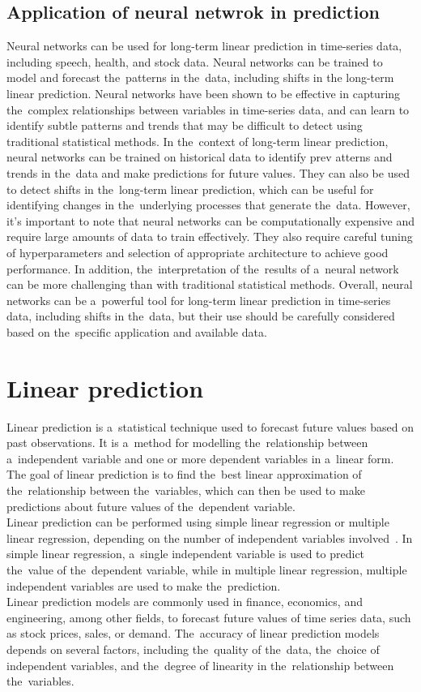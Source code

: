 \subsection{Application of neural netwrok in prediction} \label{subsec:nnprediction}
Neural networks can be used for long-term linear prediction in time-series data, including speech, health, and
stock data. Neural networks can be trained to model and forecast the~patterns in the~data, including shifts in
the long-term linear prediction. Neural networks have been shown to be effective in capturing the~complex relationships
between variables in time-series data, and can learn to identify subtle patterns and trends that may be difficult
to detect using traditional statistical methods. In the~context of long-term linear prediction, neural networks can be
trained on historical data to identify prev    atterns and trends in the~data and make predictions for future values.
They can also be used to detect shifts in the~long-term linear prediction, which can be useful for identifying
changes in the~underlying processes that generate the~data. However, it's important to note that neural networks
can be computationally expensive and require large amounts of data to train effectively. They also require careful
tuning of hyperparameters and selection of appropriate architecture to achieve good performance.
In addition, the~interpretation of the~results of a~neural network can be more challenging than with traditional
statistical methods. Overall, neural networks can be a~powerful tool for long-term linear prediction in time-series
data, including shifts in the~data, but their use should be carefully considered based on the~specific
application and available data.


\section{Linear prediction} \label{sec:lp}
Linear prediction is a~statistical technique used to forecast future values based on past observations. It is a~method
for modelling the~relationship between a~independent variable and one or more dependent variables in a~linear form.
The goal of linear prediction is to find the~best linear approximation of the~relationship between the~variables,
which can then be used to make predictions about future values of the~dependent variable.
\\
Linear prediction can be performed using simple linear regression or multiple linear regression, depending on the
number of independent variables involved~\cite{Parks}. In simple linear regression, a~single independent variable is
used to predict the~value of the~dependent variable, while in multiple linear regression, multiple independent
variables are used to make the~prediction.
\\
Linear prediction models are commonly used in finance, economics, and engineering, among other fields, to forecast
future values of time series data, such as stock prices, sales, or demand. The~accuracy of linear prediction models
depends on several factors, including the~quality of the~data, the~choice of independent variables, and the~degree of
linearity in the~relationship between the~variables.

